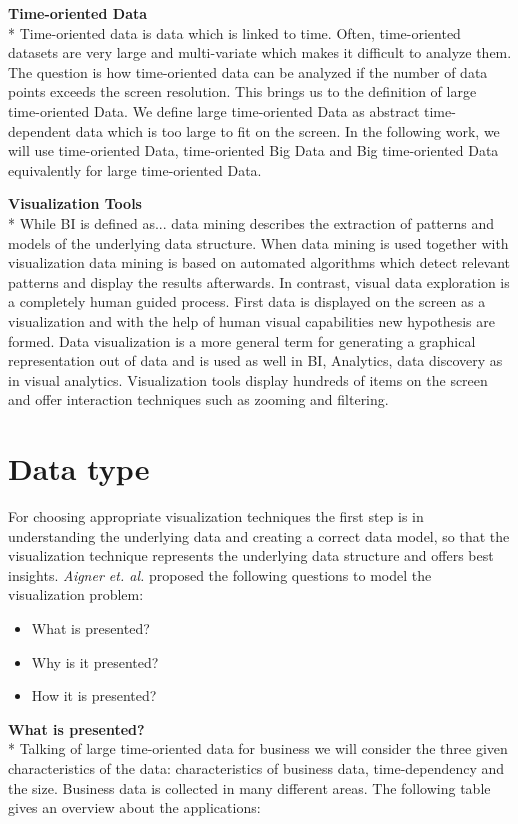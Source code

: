 \textbf{Time-oriented Data}\\*
Time-oriented data is data which is linked to time\cite{Aigner2011}. Often, time-oriented datasets are very large and multi-variate which makes it difficult to analyze them. The question is how time-oriented data can be analyzed if the number of data points exceeds the screen resolution. This brings us to the definition of large time-oriented Data. 
We define large time-oriented Data as abstract time-dependent data which is too large to fit on the screen. \cite{Shneiderman2008} 
In the following work, we will use time-oriented Data, time-oriented Big Data and Big time-oriented Data equivalently for large time-oriented Data. 




\textbf{Visualization Tools}\\*
While BI is defined as... data mining describes the extraction of patterns and models of the underlying data structure\cite{FerreiradeOliveira2003}. When data mining is used together with visualization data mining is based on automated algorithms which detect relevant patterns and display the results afterwards. In contrast, visual data exploration is a completely human guided process\cite{FerreiradeOliveira2003}. First data is displayed on the screen as a visualization and with the help of human visual capabilities new hypothesis are formed. Data visualization is a more general term for generating a graphical representation out of data and is used as well in BI, Analytics, data discovery as in visual analytics. 
Visualization tools display hundreds of items on the screen and offer interaction techniques such as zooming and filtering\cite{Shneiderman2008}.


\section{Data type} \label{data}

For choosing appropriate visualization techniques the first step is in understanding the underlying data and creating a correct data model\cite{Aigner2011}, so that the visualization technique represents the underlying data structure and offers best insights\cite{Bacic}. \textit{Aigner et. al.} proposed  the following questions to model the visualization problem: 
\begin{itemize}
    \item What is presented?
    \item Why is it presented?
    \item How it is presented?
\end{itemize}
\textbf{What is presented?}\\*
Talking of large time-oriented data for business we will consider the three given characteristics of the data: characteristics of business data, time-dependency and the size. Business data is collected in many different areas. The following table gives an overview about the applications: 

